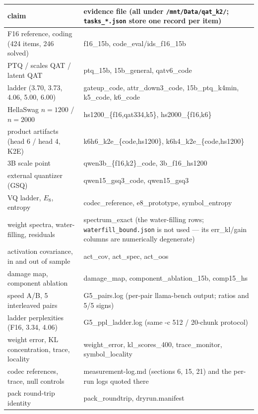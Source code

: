 \documentclass[11pt,a4paper]{article}
\begin{document}
\begin{table}[h]
\centering\footnotesize
\setlength{\tabcolsep}{3pt}
\begin{tabular}{@{}l p{}@{}}
\toprule
claim & evidence file (all under \texttt{/mnt/Data/qat\_k2/}; \texttt{tasks\_*.json} store one record per item)\\
\midrule
F16 reference, coding (424 items, 246 solved) & f16\_15b, code\_eval/ids\_f16\_15b\\
PTQ / scales QAT / latent QAT & ptq\_15b, 15b\_general, qatv6\_code\\
ladder (3.70, 3.73, 4.06, 5.00, 6.00) & gateup\_code, attr\_down3\_code, 15b\_ptq\_k4min, k5\_code, k6\_code\\
HellaSwag $n{=}1200$ / $n{=}2000$ & hs1200\_\{f16,qat334,k5\}, hs2000\_\{f16,k6\}\\
product artifacts (head 6 / head 4, K2E) & k6h6\_k2e\_\{code,hs1200\}, k6h4\_k2e\_\{code,hs1200\}\\
3B scale point & qwen3b\_\{f16,k2\}\_code, 3b\_f16\_hs1200\\
external quantizer (GSQ) & qwen15\_gsq3\_code, qwen15\_gsq3\\
VQ ladder, $E_8$, entropy & codec\_reference, e8\_prototype, symbol\_entropy\\
weight spectra, water-filling, residuals & spectrum\_exact (the water-filling rows; \texttt{waterfill\_bound.json} is not used --- its err\_kl/gain columns are numerically degenerate)\\
activation covariance, in and out of sample & act\_cov, act\_spec, act\_oos\\
damage map, component ablation & damage\_map, component\_ablation\_15b, comp15\_hs\\
speed A/B, 5 interleaved pairs & G5\_pairs.log (per-pair llama-bench output; ratios and 5/5 signs)\\
ladder perplexities (F16, 3.34, 4.06) & G5\_ppl\_ladder.log (same -c 512 / 20-chunk protocol)\\
weight error, KL concentration, trace, locality & weight\_error, kl\_scores\_400, trace\_monitor, symbol\_locality\\
codec references, trace, null controls & measurement-log.md (sections 6, 15, 21) and the per-run logs
quoted there\\
pack round-trip identity & pack\_roundtrip, dryrun.manifest\\
\bottomrule
\end{tabular}
\end{table}
\end{document}
